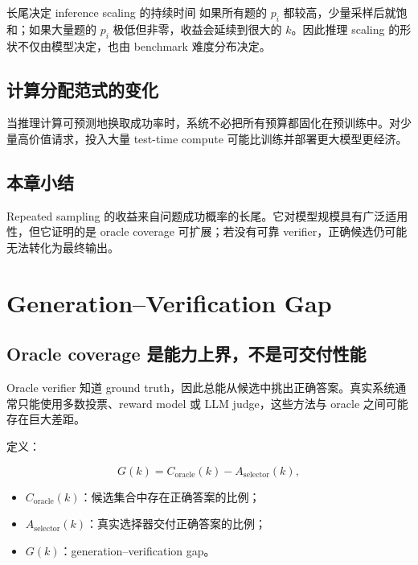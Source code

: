 \documentclass[a4paper]{article}
\begin{document}
\begin{importantbox}{长尾决定 inference scaling 的持续时间}
如果所有题的 $p_i$ 都较高，少量采样后就饱和；如果大量题的 $p_i$ 极低但非零，收益会延续到很大的 $k$。因此推理 scaling 的形状不仅由模型决定，也由 benchmark 难度分布决定。
\end{importantbox}

\subsection{计算分配范式的变化}

当推理计算可预测地换取成功率时，系统不必把所有预算都固化在预训练中。对少量高价值请求，投入大量 test-time compute 可能比训练并部署更大模型更经济。


\subsection{本章小结}

Repeated sampling 的收益来自问题成功概率的长尾。它对模型规模具有广泛适用性，但它证明的是 oracle coverage 可扩展；若没有可靠 verifier，正确候选仍可能无法转化为最终输出。

\section{Generation--Verification Gap}

\subsection{Oracle coverage 是能力上界，不是可交付性能}

Oracle verifier 知道 ground truth，因此总能从候选中挑出正确答案。真实系统通常只能使用多数投票、reward model 或 LLM judge，这些方法与 oracle 之间可能存在巨大差距。


定义：

$$
G(k)=C_{\mathrm{oracle}}(k)-A_{\mathrm{selector}}(k),
$$

\begin{itemize}
    \item $C_{\mathrm{oracle}}(k)$：候选集合中存在正确答案的比例；
    \item $A_{\mathrm{selector}}(k)$：真实选择器交付正确答案的比例；
    \item $G(k)$：generation--verification gap。
\end{itemize}
\end{document}
